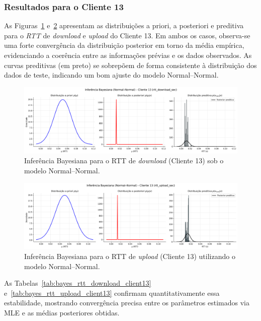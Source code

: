 \documentclass{article}
\begin{document}
\subsubsection{Resultados para o Cliente 13}

As Figuras~\ref{fig:rtt_download_sec_bayesian_normalnormal_client13} e~\ref{fig:rtt_upload_sec_bayesian_normalnormal_client13} apresentam as distribuições a priori, a posteriori e preditiva para o \textit{RTT} de \textit{download} e \textit{upload} do Cliente 13.
Em ambos os casos, observa-se uma forte convergência da distribuição posterior em torno da média empírica, evidenciando a coerência entre as informações prévias e os dados observados.
As curvas preditivas (em preto) se sobrepõem de forma consistente à distribuição dos dados de teste, indicando um bom ajuste do modelo Normal–Normal.

\begin{figure}[H]
	\centering
	\includegraphics[width=\textwidth]{../figures/bayes/rtt_download_sec_bayesian_normalnormal_client13.png}
	\caption{Inferência Bayesiana para o RTT de \textit{download} (Cliente 13) sob o modelo Normal–Normal.}
	\label{fig:rtt_download_sec_bayesian_normalnormal_client13}
\end{figure}
\begin{figure}[htp!]
	\centering
	\includegraphics[width=\textwidth]{../figures/bayes/rtt_upload_sec_bayesian_normalnormal_client13.png}
	\caption{Inferência Bayesiana para o RTT de \textit{upload} (Cliente 13) utilizando o modelo Normal–Normal.}
	\label{fig:rtt_upload_sec_bayesian_normalnormal_client13}
\end{figure}

\newpage
As Tabelas~\ref{tab:bayes_rtt_download_client13} e~\ref{tab:bayes_rtt_upload_client13} confirmam quantitativamente essa estabilidade, mostrando convergência precisa entre os parâmetros estimados via MLE e as médias posteriores obtidas.
\end{document}
